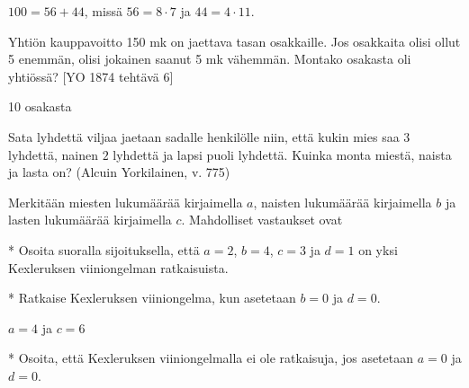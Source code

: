 \begin{kotitehtavasivu}
\begin{tehtava}
    \begin{vastaus}
        $100 = 56 + 44$, missä $56 = 8 \cdot 7$ ja $44 = 4 \cdot 11$.
    \end{vastaus}
    
\end{tehtava}

\begin{tehtava}
    Yhtiön kauppavoitto 150 mk on jaettava tasan osakkaille. Jos osakkaita olisi ollut 5 enemmän, olisi jokainen saanut 5 mk vähemmän. Montako osakasta oli yhtiössä?  [YO 1874 tehtävä 6]
    
    \begin{vastaus}
        10 osakasta
    \end{vastaus}
    
\end{tehtava}

\begin{tehtava}
    Sata lyhdettä viljaa jaetaan sadalle henkilölle niin, että kukin mies saa $3$ lyhdettä, nainen $2$ lyhdettä ja lapsi puoli lyhdettä. Kuinka monta miestä, naista ja lasta on? (Alcuin Yorkilainen, v. 775)
    
    \begin{vastaus}
        Merkitään miesten lukumäärää kirjaimella $a$, naisten lukumäärää kirjaimella $b$ ja lasten lukumäärää kirjaimella $c$. Mahdolliset vastaukset ovat
    \end{vastaus}
    
\end{tehtava}

\begin{tehtava} %
    * Osoita suoralla sijoituksella, että $a=2$, $b=4$, $c=3$ ja $d=1$ on yksi Kexleruksen viiniongelman ratkaisuista.
\end{tehtava}

\begin{tehtava} %
    * Ratkaise Kexleruksen viiniongelma, kun asetetaan $b=0$ ja $d=0$.

    \begin{vastaus}
        $a = 4$ ja $c = 6$
    \end{vastaus}
    
\end{tehtava}

\begin{tehtava} %
    * Osoita, että Kexleruksen viiniongelmalla ei ole ratkaisuja, jos asetetaan $a=0$ ja $d=0$.
\end{tehtava}

\end{kotitehtavasivu}
